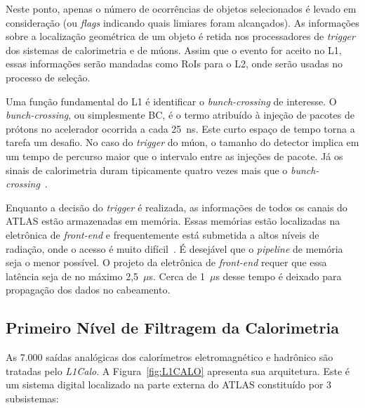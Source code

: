 Neste ponto, apenas o número de ocorrências de objetos selecionados é levado em
consideração (ou \emph{flags} indicando quais limiares foram alcançados). As
informações sobre a localização geométrica de um objeto é retida nos
processadores de \emph{trigger} dos sistemas de calorimetria e de múons. Assim
que o evento for aceito no L1, essas informações serão mandadas como RoIs para o
L2, onde serão usadas no processo de seleção.

Uma função fundamental do L1 é identificar o \emph{bunch-crossing} de interesse.
O \emph{bunch-crossing}, ou simplesmente BC, é o termo atribuído à injeção de
pacotes de prótons no acelerador ocorrida a cada 25~ns. Este curto espaço de
tempo torna a tarefa um desafio. No caso do \emph{trigger} do múon, o tamanho do
detector implica em um tempo de percurso maior que o intervalo entre as injeções
de pacote. Já os sinais de calorimetria duram tipicamente quatro vezes mais que
o \emph{bunch-crossing}~\cite{ATLAS2008}.

Enquanto a decisão do \emph{trigger} é realizada, as informações de todos os
canais do ATLAS estão armazenadas em memória. Essas memórias estão localizadas
na eletrônica de \emph{front-end} e frequentemente está submetida a altos
níveis de radiação, onde o acesso é muito difícil~\cite{ATLAS2008}. É desejável
que o \emph{pipeline} de memória seja o menor possível. O projeto da eletrônica
de \emph{front-end} requer que essa latência seja de no máximo 2,5~$\mu$s.
Cerca de 1~$\mu$s desse tempo é deixado para propagação dos dados no
cabeamento.

\subsection*{Primeiro Nível de Filtragem da Calorimetria}

As 7.000 saídas analógicas dos calorímetros eletromagnético e hadrônico são
tratadas pelo \emph{L1Calo}. A Figura~\ref{fig:L1CALO} apresenta sua
arquitetura. Este é um sistema digital localizado na parte externa do ATLAS
constituído por 3 subsistemas:

